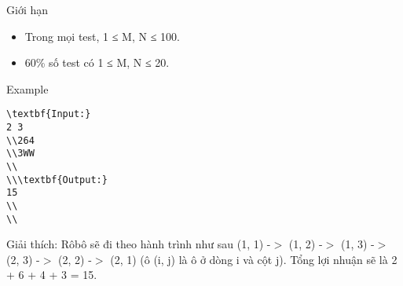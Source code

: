 Giới hạn  
\begin{itemize}
	\item     Trong mọi test, 1 ≤ M, N ≤ 100.   
	\item     60\% số test có 1 ≤ M, N ≤ 20.   
\end{itemize}
   Example  
\begin{verbatim}
\textbf{Input:}
2 3
\\264
\\3WW
\\
\\\textbf{Output:}
15
\\
\\\end{verbatim}

Giải thích: Rôbô sẽ đi theo hành trình như sau (1, 1) -$>$ (1, 2) -$>$ (1, 3) -$>$ (2, 3) -$>$ (2, 2) -$>$ (2, 1) (ô (i, j) là ô ở dòng i và cột j). Tổng lợi nhuận sẽ là 2 + 6 + 4 + 3 = 15.